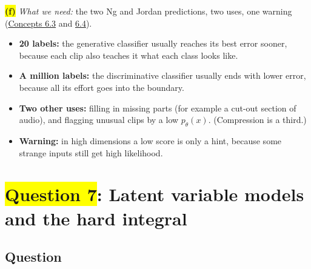 \documentclass[12pt,a4paper]{article}
\begin{document}
\colorbox{yellow}{\textbf{(f)}} \emph{What we need:} the two Ng and Jordan predictions, two uses, one warning (\hyperref[c6-3]{Concepts 6.3} and \hyperref[c6-4]{6.4}).
\begin{itemize}[nosep]
  \item \textbf{20 labels:} the generative classifier usually reaches its best error sooner, because each clip also teaches it what each class looks like.
  \item \textbf{A million labels:} the discriminative classifier usually ends with lower error, because all its effort goes into the boundary.
  \item \textbf{Two other uses:} filling in missing parts (for example a cut-out section of audio), and flagging unusual clips by a low $p_\theta(x)$. (Compression is a third.)
  \item \textbf{Warning:} in high dimensions a low score is only a hint, because some strange inputs still get high likelihood.
\end{itemize}
\newpage
\section{\texorpdfstring{\colorbox{yellow}{Question 7}}{Question 7}: Latent variable models and the hard integral}

\subsection{Question}
\end{document}
